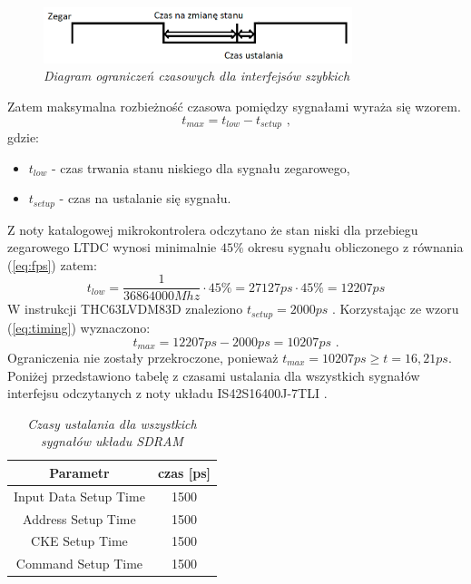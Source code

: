\documentclass[eng,printmode]{mgr}
\begin{document}
\begin{figure}[thb]
    \centering
    \includegraphics[width=9cm]{plots/timing.png}
    \caption{\textit{Diagram ograniczeń czasowych dla interfejsów szybkich}}
\end{figure}
\noindent
Zatem maksymalna rozbieżność czasowa pomiędzy sygnałami wyraża się wzorem.
\begin{equation}
t_{max} = t_{low}- t_{setup} \label{eq:timing}\textrm{ ,}
\end{equation}
gdzie:
\begin{itemize}
  \item \textbf{$t_{low}$} - czas trwania stanu niskiego dla sygnału zegarowego,
  \item \textbf{$t_{setup}$} - czas na ustalanie się sygnału.
\end{itemize}

Z noty katalogowej mikrokontrolera odczytano że stan niski dla przebiegu zegarowego LTDC wynosi minimalnie $45\%$
okresu sygnału obliczonego z równania (\ref{eq:fps}) zatem:
$$
t_{low} = \frac{1}{36864000Mhz} \cdot 45\% = 27127ps\cdot45\% = 12207ps
$$
W instrukcji THC63LVDM83D znaleziono $t_{setup} = 2000ps$ \cite{dispTiming}. Korzystając ze wzoru (\ref{eq:timing}) wyznaczono:
$$
t_{max} = 12207ps - 2000ps = 10207ps\textrm{ .}
$$
Ograniczenia nie zostały przekroczone, ponieważ $t_{max}= 10207ps \geq t=16,21ps$.\\

Poniżej przedstawiono tabelę z czasami ustalania dla wszystkich sygnałów interfejsu odczytanych z noty układu IS42S16400J-7TLI \cite{sdram}.

\begin{table}[htb]
\def\arraystretch{1.3}%
\caption{\textit{ Czasy ustalania dla wszystkich sygnałów układu SDRAM}}
\label{tab:sdramTiming}
\begin{center}
\begin{tabular}{ |c|c| }
\hline
Parametr  & czas [ps] \\ 
\hline
Input Data Setup Time & 1500 \\ 
\hline
Address Setup Time & 1500\\ 
\hline
CKE Setup Time	 & 1500\\ 
\hline
Command Setup Time	 & 1500\\ 
\hline
\end{tabular}
\end{center}
\end{table}
\end{document}
